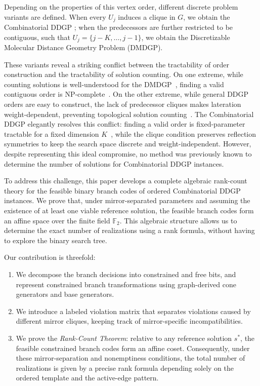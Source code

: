 \documentclass[11pt]{article}
\theoremstyle{plain}
\theoremstyle{definition}
\begin{document}
Depending on the properties of this vertex order, different discrete problem variants are defined. When every $U_j$ induces a clique in $G$, we obtain the Combinatorial DDGP \cite{abud2024impossible}; when the predecessors are further restricted to be contiguous, such that $U_j=\{j-K, \ldots, j-1\}$, we obtain the Discretizable Molecular Distance Geometry Problem (DMDGP).

These variants reveal a striking conflict between the tractability of order construction and the tractability of solution counting. On one extreme, while counting solutions is well-understood for the DMDGP~\cite{liberti2013counting}, finding a valid contiguous order is NP-complete~\cite{cassioli2015discretization}. On the other extreme, while general DDGP orders are easy to construct, the lack of predecessor cliques makes lateration weight-dependent, preventing topological solution counting~\cite{abud2024impossible}. The Combinatorial DDGP elegantly resolves this conflict: finding a valid order is fixed-parameter tractable for a fixed dimension $K$~\cite{cassioli2015discretization}, while the clique condition preserves reflection symmetries to keep the search space discrete and weight-independent. However, despite representing this ideal compromise, no method was previously known to determine the number of solutions for Combinatorial DDGP instances.

To address this challenge, this paper develops a complete algebraic rank-count theory for the feasible binary branch codes of ordered Combinatorial DDGP instances. We prove that, under mirror-separated parameters and assuming the existence of at least one viable reference solution, the feasible branch codes form an affine space over the finite field \(\mathbb{F}_2\). This algebraic structure allows us to determine the exact number of realizations using a rank formula, without having to explore the binary search tree.

Our contribution is threefold:
\begin{enumerate}
    \item We decompose the branch decisions into constrained and free bits, and represent constrained branch transformations using graph-derived cone generators and base generators.
    \item We introduce a labeled violation matrix that separates violations caused by different mirror cliques, keeping track of mirror-specific incompatibilities.
    \item We prove the \emph{Rank-Count Theorem}: relative to any reference solution $s^\ast$, the feasible constrained branch codes form an affine coset. Consequently, under these mirror-separation and nonemptiness conditions, the total number of realizations is given by a precise rank formula depending solely on the ordered template and the active-edge pattern.
\end{enumerate}
\end{document}
